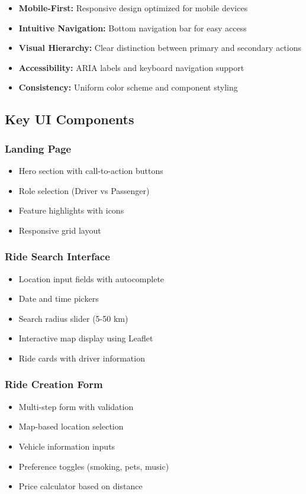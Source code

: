 \documentclass[12pt,a4paper]{article}
\begin{document}
\begin{itemize}
    \item \textbf{Mobile-First:} Responsive design optimized for mobile devices
    \item \textbf{Intuitive Navigation:} Bottom navigation bar for easy access
    \item \textbf{Visual Hierarchy:} Clear distinction between primary and secondary actions
    \item \textbf{Accessibility:} ARIA labels and keyboard navigation support
    \item \textbf{Consistency:} Uniform color scheme and component styling
\end{itemize}

\subsection{Key UI Components}

\subsubsection{Landing Page}
\begin{itemize}
    \item Hero section with call-to-action buttons
    \item Role selection (Driver vs Passenger)
    \item Feature highlights with icons
    \item Responsive grid layout
\end{itemize}

\subsubsection{Ride Search Interface}
\begin{itemize}
    \item Location input fields with autocomplete
    \item Date and time pickers
    \item Search radius slider (5-50 km)
    \item Interactive map display using Leaflet
    \item Ride cards with driver information
\end{itemize}

\subsubsection{Ride Creation Form}
\begin{itemize}
    \item Multi-step form with validation
    \item Map-based location selection
    \item Vehicle information inputs
    \item Preference toggles (smoking, pets, music)
    \item Price calculator based on distance
\end{itemize}
\end{document}
